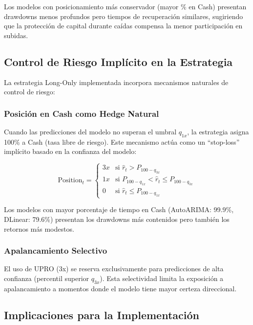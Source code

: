 Los modelos con posicionamiento m\'as conservador (mayor \% en Cash) presentan drawdowns menos profundos pero tiempos de recuperaci\'on similares, sugiriendo que la protecci\'on de capital durante ca\'idas compensa la menor participaci\'on en subidas.

\subsection{Control de Riesgo Impl\'icito en la Estrategia}
\label{subsec:implicit_risk_control}

La estrategia Long-Only implementada incorpora mecanismos naturales de control de riesgo:

\subsubsection{Posici\'on en Cash como Hedge Natural}

Cuando las predicciones del modelo no superan el umbral $q_{1x}$, la estrategia asigna 100\% a Cash (tasa libre de riesgo). Este mecanismo act\'ua como un ``stop-loss'' impl\'icito basado en la confianza del modelo:

\begin{equation}
\text{Position}_t = \begin{cases}
3x & \text{si } \hat{r}_t > P_{100-q_{3x}} \\
1x & \text{si } P_{100-q_{1x}} < \hat{r}_t \leq P_{100-q_{3x}} \\
0 & \text{si } \hat{r}_t \leq P_{100-q_{1x}}
\end{cases}
\end{equation}

Los modelos con mayor porcentaje de tiempo en Cash (AutoARIMA: 99.9\%, DLinear: 79.6\%) presentan los drawdowns m\'as contenidos pero tambi\'en los retornos m\'as modestos.

\subsubsection{Apalancamiento Selectivo}

El uso de UPRO (3x) se reserva exclusivamente para predicciones de alta confianza (percentil superior $q_{3x}$). Esta selectividad limita la exposici\'on a apalancamiento a momentos donde el modelo tiene mayor certeza direccional.

\subsection{Implicaciones para la Implementaci\'on}
\label{subsec:risk_implications}

